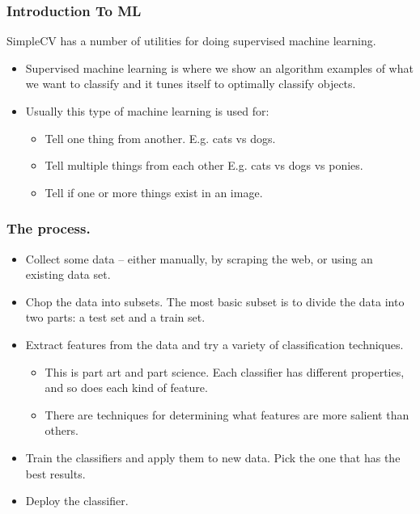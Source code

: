 \documentclass[compress]{beamer}
\begin{document}
\begin{frame}
  \frametitle{Introduction To ML}
SimpleCV has a number of utilities for doing supervised 
machine learning.
\begin{itemize}
\item Supervised machine learning is where we show an algorithm
  examples of what we want to classify and it tunes itself to
  optimally classify objects.
\item Usually this type of machine learning is used for:
  \begin{itemize}
  \item Tell one thing from another. E.g. cats vs dogs.
  \item Tell multiple things from each other E.g. cats vs dogs vs
    ponies.
  \item Tell if one or more things exist in an image. 
  \end{itemize}
\end{itemize}
\end{frame}
\begin{frame}
  \frametitle{The process.}
\begin{itemize}
\item Collect some data -- either manually, by scraping the web, or
  using an existing data set.
\item Chop the data into subsets. The most basic subset is to divide
  the data into two parts: a test set and a train set.
\item Extract features from the data and try a variety of
  classification techniques.
  \begin{itemize}
  \item This is part art and part science. Each classifier has different
    properties, and so does each kind of feature. 
  \item There are techniques for determining what features are more
    salient than others.
  \end{itemize}
\item Train the classifiers and apply them to new data. Pick the one
  that has the best results.
\item Deploy the classifier.
\end{itemize}
\end{frame}
\end{document}
